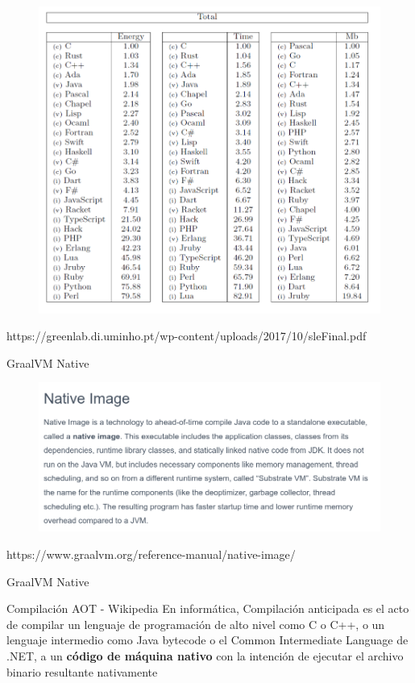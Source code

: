 \documentclass[aspectratio=169]{beamer}
\begin{document}
\begin{frame}{}
	\begin{figure}
		\centering
		\includegraphics[width=0.6\linewidth]{Images/energy.png}
	\end{figure}
{\tiny https://greenlab.di.uminho.pt/wp-content/uploads/2017/10/sleFinal.pdf}
\end{frame}

\begin{frame}{GraalVM Native}
	\begin{figure}
		\centering
		\includegraphics[width=\linewidth]{Images/nativeimagedefinition.png}
	\end{figure}
{\tiny https://www.graalvm.org/reference-manual/native-image/}
\end{frame}

\begin{frame}{GraalVM Native}
	
	\begin{block}{Compilación AOT - Wikipedia}
		En informática, Compilación anticipada es el acto de compilar un lenguaje de programación de alto nivel como C o C++, o un lenguaje intermedio como Java bytecode o el Common Intermediate Language de .NET, a un \textbf{código de máquina nativo} con la intención de ejecutar el archivo binario resultante nativamente
	\end{block}
	
\end{frame}
\end{document}
